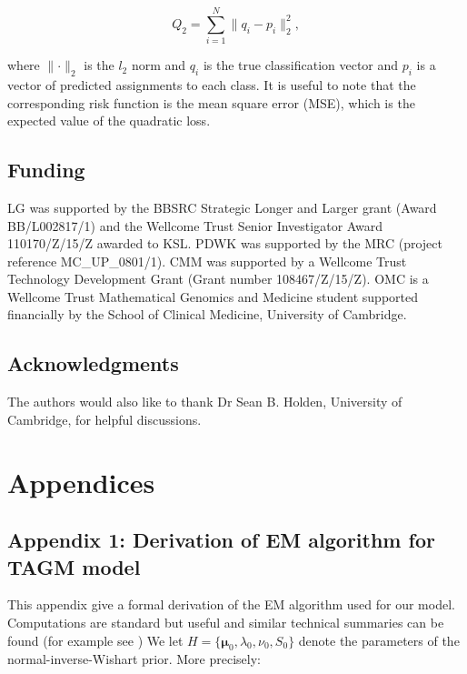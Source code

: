 \documentclass[12pt,english]{article}\usepackage[]{graphicx}\usepackage[]{color}
\begin{document}
\begin{equation}
  Q_2 = \sum_{i = 1}^{N}\lVert q_i - p_i\rVert_2^2,
\end{equation}

where $\lVert\cdot\rVert_2$ is the $l_2$ norm and $q_i$ is the true
classification vector and $p_i$ is a vector of predicted assignments
to each class. It is useful to note that the corresponding risk
function is the mean square error (MSE), which is the expected value
of the quadratic loss.

\subsection*{Funding}

LG was supported by the BBSRC Strategic Longer and Larger grant (Award
BB/L002817/1) and the Wellcome Trust Senior Investigator Award
110170/Z/15/Z awarded to KSL. PDWK was supported by the MRC (project
reference MC\_UP\_0801/1). CMM was supported by a Wellcome Trust
Technology Development Grant (Grant number 108467/Z/15/Z). OMC is a
Wellcome Trust Mathematical Genomics and Medicine student supported
financially by the School of Clinical Medicine, University of Cambridge.

\subsection*{Acknowledgments}

The authors would also like to thank Dr Sean B. Holden, University of
Cambridge, for helpful discussions.

\clearpage

\section{Appendices}

\subsection{Appendix 1: Derivation of EM algorithm for TAGM model}\label{apd:EMderv}

This appendix give a formal derivation of the EM algorithm used for
our model. Computations are standard but useful and similar technical
summaries can be found (for example see \cite{Fraley:2005,
  Murphy:2007}) We let
$H = \{\boldsymbol{\mu}_0, \lambda_0, \nu_0, S_0\}$ denote the
parameters of the normal-inverse-Wishart prior. More precisely:
\end{document}
